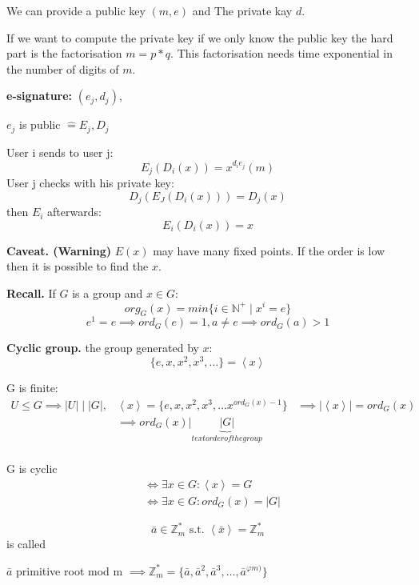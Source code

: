We can provide a public key $(m,e)$ and The private kay $d$.

If we want to compute the private key if we only know the public key the hard part is the factorisation $m = p*q$. This factorisation needs time exponential in the number of digits of $m$.

\textbf{e-signature: } 
$(e_j,d_j)$,

$e_j$ is public $\hat{=} E_j, D_j$

User i sends to user j:
\[
  E_j(D_i(x)) = x^{d_i e_j} (m)
\]
User j checks with his private key:
\[
  D_j (E_J(D_i(x))) = D_j(x)
\]
then $E_i$ afterwards:
\[
  E_i(D_i(x)) = x
\]

\textbf{Caveat. (Warning)}
$E(x)$ may have many fixed points. 
If the order is low then it is possible to find the $x$. 

\textbf{Recall.}
If $G$ is a group and $x\in G$:
\[
  org_G(x) = min\{ i\in \mathbb{N}^{+} \mid x^i = e \}
\]
\[
  e^1 = e \implies ord_G(e) = 1, a \neq e \implies ord_G(a) > 1
\]

\textbf{Cyclic group.}
the group generated by $x$:
\[
  \{ e, x, x^2, x^3, \ldots \} = \left\langle x \right\rangle
\]

G is finite:
\begin{align*}
  U \leq  G \implies |U| \mid |G|, 
  & \left\langle x \right\rangle = \{ e, x, x^2, x^3, \ldots x^{ord_G(x) -1}\}
    &\implies |\left\langle x \right\rangle| = ord_G(x) \\
    &\implies ord_G(x) | \underbrace{|G|}_{text{order of the group}} \\
\end{align*}

G is cyclic
\begin{align*}
  & \Leftrightarrow \exists x \in G: \left\langle x \right\rangle = G \\
  & \Leftrightarrow \exists x \in G: ord_G(x) = |G|
\end{align*}

\begin{definition}
  \[
    \bar{a} \in \mathbb{Z}_m^{*} \text{ s.t. } \left\langle \bar{x} \right\rangle = \mathbb{Z}_m^{*} 
\]
is called 

$\bar{a}$ primitive root mod m 
$\implies \mathbb{Z}_m^{*} = \{\bar{a}, \bar{a}^2, \bar{a}^3, \ldots, \bar{a}^{\varphi{m)}} \}$
\end{definition}

\def\GroupGenBy#1{\left\langle #1 \right\rangle}

